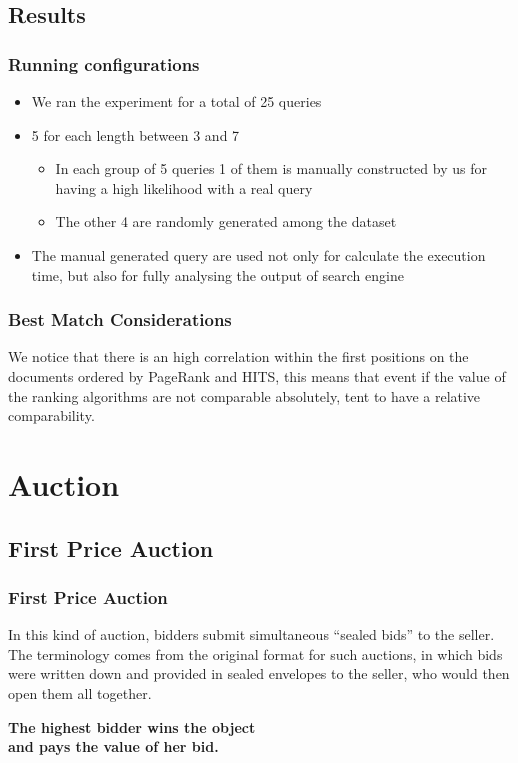 \documentclass{beamer}
\begin{document}
\subsection{Results}
\begin{frame}
\frametitle{Running configurations}
\begin{itemize}
\item We ran the experiment for a total of 25 queries
\item 5 for each length between 3 and 7
\begin{itemize}
\item In each group of 5 queries 1 of them is manually constructed by us for having a high likelihood with a real query
\item The other 4 are randomly generated among the dataset
\end{itemize} 
\item The manual generated  query are used not only for calculate the execution time, but also for fully analysing the output of search engine
\end{itemize}
\end{frame}

\begin{frame}
\frametitle{Best Match Considerations}
We notice that there is an \alert{high} correlation within the first positions on the documents ordered by PageRank and HITS, this means that event if the value of the ranking algorithms are not comparable absolutely, tent to have a \alert{relative} comparability.
\end{frame}

\section{Auction}

\subsection{First Price Auction}
\begin{frame}
\frametitle{First Price Auction}
In this kind of auction, bidders submit simultaneous ``sealed bids'' to the seller. The terminology comes from the original format for such auctions, in which bids were written down and provided in sealed envelopes to the seller, who would then open them all together.\\
\medskip
\begin{center}\textbf{The highest bidder wins the object \\ and pays the value of her bid.}\end{center}
\end{frame}
\end{document}
